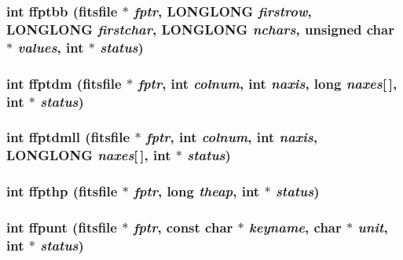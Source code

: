 \subsubsection{\setlength{\rightskip}{0pt plus 5cm}int ffptbb (\bf{fitsfile} $\ast$ {\em fptr}, \bf{LONGLONG} {\em firstrow}, \bf{LONGLONG} {\em firstchar}, \bf{LONGLONG} {\em nchars}, unsigned char $\ast$ {\em values}, int $\ast$ {\em status})}\label{fitsio__64_8h_8154f91f7c90d22f49af94d61d443036}


\subsubsection{\setlength{\rightskip}{0pt plus 5cm}int ffptdm (\bf{fitsfile} $\ast$ {\em fptr}, int {\em colnum}, int {\em naxis}, long {\em naxes}[$\,$], int $\ast$ {\em status})}\label{fitsio__64_8h_61fee5f0940f088541578184fae78ee2}


\subsubsection{\setlength{\rightskip}{0pt plus 5cm}int ffptdmll (\bf{fitsfile} $\ast$ {\em fptr}, int {\em colnum}, int {\em naxis}, \bf{LONGLONG} {\em naxes}[$\,$], int $\ast$ {\em status})}\label{fitsio__64_8h_06197ea3bc9da99920d903dd807b11a9}


\subsubsection{\setlength{\rightskip}{0pt plus 5cm}int ffpthp (\bf{fitsfile} $\ast$ {\em fptr}, long {\em theap}, int $\ast$ {\em status})}\label{fitsio__64_8h_d937788b718144227ca0e56f98b7d2ed}


\subsubsection{\setlength{\rightskip}{0pt plus 5cm}int ffpunt (\bf{fitsfile} $\ast$ {\em fptr}, const char $\ast$ {\em keyname}, char $\ast$ {\em unit}, int $\ast$ {\em status})}\label{fitsio__64_8h_67dc8b0a8bbcf6abbd2b529763a4ea17}


